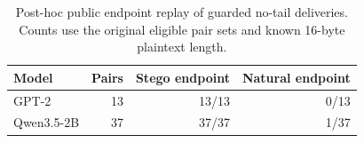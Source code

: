 \begin{table}[t]
\centering
\caption{Post-hoc public endpoint replay of guarded no-tail deliveries. Counts use the original eligible pair sets and known 16-byte plaintext length.}
\label{tab:endpoint-replay}
\begin{tabular}{lrrr}
\toprule
Model & Pairs & Stego endpoint & Natural endpoint \\
\midrule
GPT-2 & 13 & 13/13 & 0/13 \\
Qwen3.5-2B & 37 & 37/37 & 1/37 \\
\bottomrule
\end{tabular}
\end{table}
